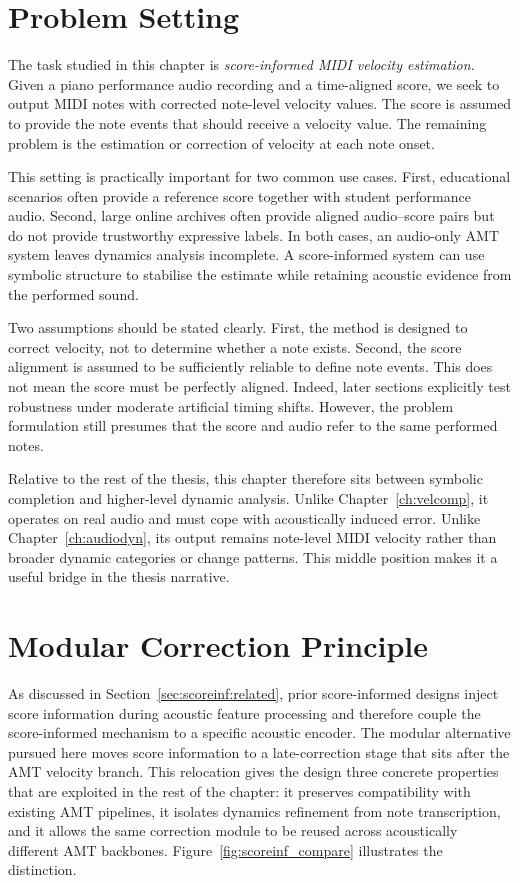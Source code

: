 \section{Problem Setting}
\label{sec:scoreinf:problem}

The task studied in this chapter is \emph{score-informed MIDI velocity estimation}. Given a piano performance audio recording and a time-aligned score, we seek to output MIDI notes with corrected note-level velocity values. The score is assumed to provide the note events that should receive a velocity value. The remaining problem is the estimation or correction of velocity at each note onset.

This setting is practically important for two common use cases. First, educational scenarios often provide a reference score together with student performance audio. Second, large online archives often provide aligned audio--score pairs but do not provide trustworthy expressive labels. In both cases, an audio-only AMT system leaves dynamics analysis incomplete. A score-informed system can use symbolic structure to stabilise the estimate while retaining acoustic evidence from the performed sound.

Two assumptions should be stated clearly. First, the method is designed to correct velocity, not to determine whether a note exists. Second, the score alignment is assumed to be sufficiently reliable to define note events. This does not mean the score must be perfectly aligned. Indeed, later sections explicitly test robustness under moderate artificial timing shifts. However, the problem formulation still presumes that the score and audio refer to the same performed notes.

Relative to the rest of the thesis, this chapter therefore sits between symbolic completion and higher-level dynamic analysis. Unlike Chapter~\ref{ch:velcomp}, it operates on real audio and must cope with acoustically induced error. Unlike Chapter~\ref{ch:audiodyn}, its output remains note-level MIDI velocity rather than broader dynamic categories or change patterns. This middle position makes it a useful bridge in the thesis narrative.

\section{Modular Correction Principle}
\label{sec:scoreinf:principle}

As discussed in Section~\ref{sec:scoreinf:related}, prior score-informed designs inject score information during acoustic feature processing and therefore couple the score-informed mechanism to a specific acoustic encoder. The modular alternative pursued here moves score information to a late-correction stage that sits after the AMT velocity branch. This relocation gives the design three concrete properties that are exploited in the rest of the chapter: it preserves compatibility with existing AMT pipelines, it isolates dynamics refinement from note transcription, and it allows the same correction module to be reused across acoustically different AMT backbones. Figure~\ref{fig:scoreinf_compare} illustrates the distinction.

